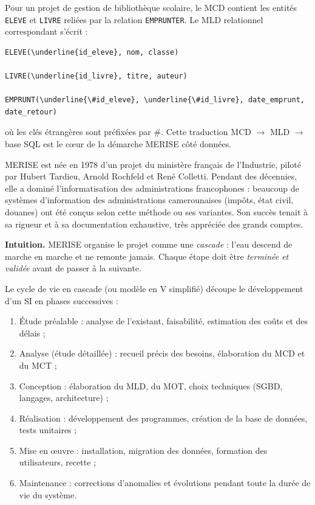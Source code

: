 \documentclass[11pt]{article}
\newcommand{\cle}[1]{{\popxbold\color{popdark}#1}}
\newcounter{popsec}
\newcounter{popsub}
\newcommand{\courssub}[1]{%
  \stepcounter{popsub}%
  \par\vspace{9pt}\noindent{\popxbold\fontsize{11.5}{13}\selectfont\color{popink}{\color{poporange}\thepopsec.\thepopsub}\hspace{6pt}#1}\par\nopagebreak\vspace{4pt}
}
\begin{document}
\begin{exemplebox}
Pour un projet de gestion de bibliothèque scolaire, le MCD contient les entités \texttt{ELEVE} et \texttt{LIVRE} reliées par la relation \texttt{EMPRUNTER}. Le MLD relationnel correspondant s'écrit :
\begin{lstlisting}
ELEVE(\underline{id_eleve}, nom, classe)

LIVRE(\underline{id_livre}, titre, auteur)

EMPRUNT(\underline{\#id_eleve}, \underline{\#id_livre}, date_emprunt, date_retour)
\end{lstlisting}
où les clés étrangères sont préfixées par \#. Cette traduction MCD $\rightarrow$ MLD $\rightarrow$ base SQL est le cœur de la démarche MERISE côté données.
\end{exemplebox}

\begin{savaistu}
MERISE est née en 1978 d'un projet du ministère français de l'Industrie, piloté par Hubert Tardieu, Arnold Rochfeld et René Colletti. Pendant des décennies, elle a dominé l'informatisation des administrations francophones : beaucoup de systèmes d'information des administrations camerounaises (impôts, état civil, douanes) ont été conçus selon cette méthode ou ses variantes. Son succès tenait à sa rigueur et à sa documentation exhaustive, très appréciée des grands comptes.
\end{savaistu}

\courssub{Le cycle de vie en cascade}

\textbf{Intuition.} MERISE organise le projet comme une \emph{cascade} : l'eau descend de marche en marche et ne remonte jamais. Chaque étape doit être \emph{terminée et validée} avant de passer à la suivante.

\begin{definition}
Le \cle{cycle de vie en cascade} (ou modèle en V simplifié) découpe le développement d'un SI en phases successives :
\begin{enumerate}
  \item \cle{Étude préalable} : analyse de l'existant, faisabilité, estimation des coûts et des délais ;
  \item \cle{Analyse} (étude détaillée) : recueil précis des besoins, élaboration du MCD et du MCT ;
  \item \cle{Conception} : élaboration du MLD, du MOT, choix techniques (SGBD, langages, architecture) ;
  \item \cle{Réalisation} : développement des programmes, création de la base de données, tests unitaires ;
  \item \cle{Mise en œuvre} : installation, migration des données, formation des utilisateurs, recette ;
  \item \cle{Maintenance} : corrections d'anomalies et évolutions pendant toute la durée de vie du système.
\end{enumerate}
\end{definition}
\end{document}
